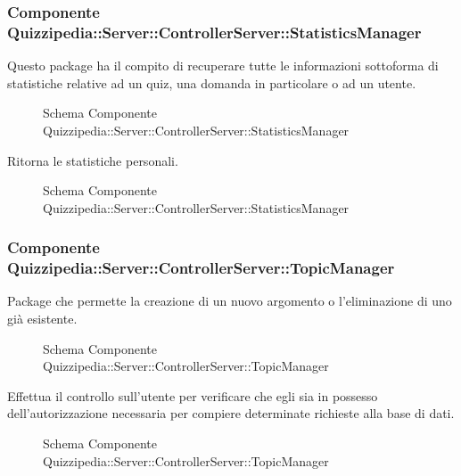 \subsubsection{Componente Quizzipedia::Server::ControllerServer::StatisticsManager}
Questo package ha il compito di recuperare tutte le informazioni sottoforma di statistiche relative ad un quiz, una domanda in particolare o ad un utente.
\begin{figure}[H]
\centering
\noindent{}
\caption{Schema Componente Quizzipedia::Server::ControllerServer::StatisticsManager}
\end{figure}
Ritorna le statistiche personali.
\begin{figure}[H]
\centering
\noindent{}
\caption{Schema Componente Quizzipedia::Server::ControllerServer::StatisticsManager}
\end{figure}
\subsubsection{Componente Quizzipedia::Server::ControllerServer::TopicManager}
Package che permette la creazione di un nuovo argomento o l'eliminazione di uno già esistente.
\begin{figure}[H]
\centering
\noindent{}
\caption{Schema Componente Quizzipedia::Server::ControllerServer::TopicManager}
\end{figure}
Effettua il controllo sull'utente per verificare che egli sia in possesso dell'autorizzazione necessaria per compiere determinate richieste alla base di dati.
\begin{figure}[H]
\centering
\noindent{}
\caption{Schema Componente Quizzipedia::Server::ControllerServer::TopicManager}
\end{figure}
